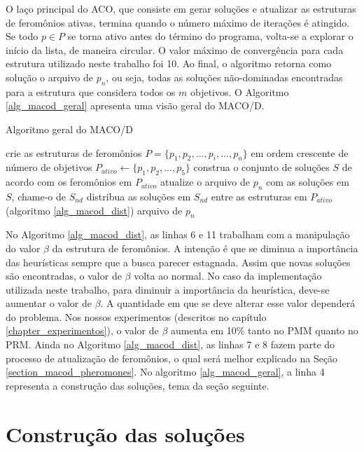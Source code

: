 O laço principal do ACO, que consiste em gerar soluções e atualizar as estruturas de feromônios ativas, termina quando o número máximo de iterações é atingido. Se todo $p \in P$ se torna ativo antes do término do programa, volta-se a explorar o início da lista, de maneira circular.  O valor máximo de convergência para cada estrutura utilizado neste trabalho foi 10. Ao final, o algoritmo retorna como solução o arquivo de $p_n$, ou seja, todas as soluções não-dominadas encontradas para a estrutura que considera todos os $m$ objetivos. O Algoritmo \ref{alg_macod_geral} apresenta uma visão geral do MACO/D.

\begin{algorithm}
	\caption{Algoritmo geral do MACO/D}
	\label{alg_macod_geral}
	\begin{algorithmic}[1]
		\State crie as estruturas de feromônios $P = \{p_1, p_2, ..., p_i, ..., p_n\}$ em ordem crescente de número de objetivos
		\State $P_{ativo} \gets \{p_1, p_2, ..., p_5\}$
			\State construa o conjunto de soluções $S$ de acordo com os feromônios em $P_{ativo}$
			\State atualize o arquivo de $p_n$ com as soluções em $S$, chame-o de $S_{nd}$
			\State distribua as soluções em $S_{nd}$ entre as estruturas em $P_{ativo}$ (algoritmo \ref{alg_macod_dist})
		\EndWhile
		\State \Return arquivo de $p_n$
	\end{algorithmic}
\end{algorithm}

No Algoritmo \ref{alg_macod_dist}, as linhas 6 e 11 trabalham com a manipulação do valor $\beta$ da estrutura de feromônios. A intenção é que se diminua a importância das heurísticas sempre que a busca parecer estagnada. Assim que novas soluções são encontradas, o valor de $\beta$ volta ao normal. No caso da implementação utilizada neste trabalho, para diminuir a importância da heurística, deve-se aumentar o valor de $\beta$. A quantidade em que se deve alterar esse valor dependerá do problema. Nos nossos experimentos (descritos no capítulo \ref{chapter_experimentos}), o valor de $\beta$ aumenta em 10\% tanto no PMM quanto no PRM. Ainda no Algoritmo \ref{alg_macod_dist}, as linhas 7 e 8 fazem parte do processo de atualização de feromônios, o qual será melhor explicado na Seção \ref{section_macod_pheromones}. No algoritmo \ref{alg_macod_geral}, a linha 4 representa a construção das soluções, tema da seção seguinte.

\section{Construção das soluções}


